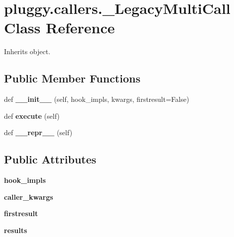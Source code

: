 \hypertarget{classpluggy_1_1callers_1_1___legacy_multi_call}{}\section{pluggy.\+callers.\+\_\+\+Legacy\+Multi\+Call Class Reference}
\label{classpluggy_1_1callers_1_1___legacy_multi_call}


Inherits object.

\subsection*{Public Member Functions}
\begin{DoxyCompactItemize}
\item 
\mbox{\label{classpluggy_1_1callers_1_1___legacy_multi_call_a072f2b3eda044d33ca8c54c82289fb1c}} 
def {\bfseries \+\_\+\+\_\+init\+\_\+\+\_\+} (self, hook\+\_\+impls, kwargs, firstresult=False)
\item 
\mbox{\label{classpluggy_1_1callers_1_1___legacy_multi_call_a759acd6e848572a82bd8be0fe5851a1f}} 
def {\bfseries execute} (self)
\item 
\mbox{\label{classpluggy_1_1callers_1_1___legacy_multi_call_a2cc09fe509cfe6e32575dc16f63ce907}} 
def {\bfseries \+\_\+\+\_\+repr\+\_\+\+\_\+} (self)
\end{DoxyCompactItemize}
\subsection*{Public Attributes}
\begin{DoxyCompactItemize}
\item 
\mbox{\label{classpluggy_1_1callers_1_1___legacy_multi_call_a27623305460eed160ecead81aec91fa5}} 
{\bfseries hook\+\_\+impls}
\item 
\mbox{\label{classpluggy_1_1callers_1_1___legacy_multi_call_ab576e5c7ff27b74cbfaab450f1019115}} 
{\bfseries caller\+\_\+kwargs}
\item 
\mbox{\label{classpluggy_1_1callers_1_1___legacy_multi_call_af7de39781273b5c105de87c227857958}} 
{\bfseries firstresult}
\item 
\mbox{\label{classpluggy_1_1callers_1_1___legacy_multi_call_a841d8e78af540b0210af9f8a2cd2615e}} 
{\bfseries results}
\end{DoxyCompactItemize}


